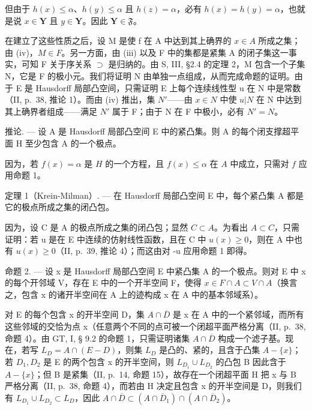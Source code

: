 但由于 \(h(x) \leqslant \alpha\)、\(h(y) \leqslant \alpha\) 且 \(h(z) = \alpha\)，必有 \(h(x) = h(y) = \alpha\)，也就是说 \(x \in \mathbf{Y}\) 且 \(y \in \mathbf{Y}\)。因此 \(\mathbf{Y} \in \mathfrak{F}\)。

在建立了这些性质之后，设 M 是使 f 在 A 中达到其上确界的 \(x \in A\) 所成之集；由 (iv)，\(M \in F\)。另一方面，由 (iii) 以及 F 中的集都是紧集 A 的闭子集这一事实，可知 F 关于序关系 \(\supset\) 是归纳的。由 S, III, §2.4 的定理 2，M 包含一个子集 N，它是 F 的极小元。我们将证明 N 由单独一点组成，从而完成命题的证明。由于 E 是 Hausdorff 局部凸空间，只需证明 E 上每个连续线性型 u 在 N 中是常数（II, p.~38, 推论 1）。而由 (iv) 推出，集 \(N'\)——由 \(x \in N\) 中使 \(u|N\) 在 N 中达到其上确界者组成——满足 \(N'\) 属于 F；由于 N 在 F 中极小，必有 \(N' = N\)。

推论. --- 设 A 是 Hausdorff 局部凸空间 E 中的紧凸集。则 A 的每个闭支撑超平面 H 至少包含 A 的一个极点。

因为，若 \(f(x) = \alpha\) 是 \(H\) 的一个方程，且 \(f(x) \leqslant \alpha\) 在 \(A\) 中成立，只需对 \(f\) 应用命题 1。

定理 1（Krein-Milman）. --- 在 Hausdorff 局部凸空间 E 中，每个紧凸集 A 都是它的极点所成之集的闭凸包。

因为，设 C 是 A 的极点所成之集的闭凸包；显然 \(C \subset A\)。为看出 \(A \subset C\)，只需证明：若 u 是在 E 中连续的仿射线性函数，且在 C 中 \(u(x) \geqslant 0\)，则在 A 中也有 \(u(x) \geqslant 0\)（II, p.~39, 推论 4）；而这由对 -u 应用命题 1 即得。

命题 2. --- 设 x 是 Hausdorff 局部凸空间 E 中紧凸集 A 的一个极点。则对 E 中 x 的每个开邻域 V，存在 E 中的一个开半空间 F，使得 \(x \in F \cap A \subset V \cap A\)（换言之，包含 x 的诸开半空间在 A 上的迹构成 x 在 A 中的基本邻域系）。

对 E 的每个包含 x 的开半空间 D，集 \(A \cap \overline{D}\) 是 x 在 A 中的一个紧邻域，而所有这些邻域的交恰为点 x（任意两个不同的点可被一个闭超平面严格分离（II, p.~38, 命题 4）。由 GT, I, § 9.2 的命题 1，只需证明诸集 \(A \cap \overline{D}\) 构成一个滤子基。现在，若写 \(L_{D} = A \cap (E - D)\)，则集 \(L_{D}\) 是凸的、紧的，且含于凸集 \(A - \{x\}\)；若 \(D_{1}, D_{2}\) 是 E 的两个包含 x 的开半空间，则 \(L_{D_{1}} \cup L_{D_{2}}\) 的凸包 B 因此含于 \(A - \{x\}\)；但 B 是紧集（II, p.~14, 命题 15），故存在一个闭超平面 H 把 x 与 B 严格分离（II, p.~38, 命题 4），而若由 H 决定且包含 x 的开半空间是 D，则我们有 \(L_{D_{1}} \cup L_{D_{2}} \subset L_{D}\)，因此 \(A \cap \overline{D} \subset (A \cap \overline{D}_{1}) \cap (A \cap \overline{D}_{2})\)。

